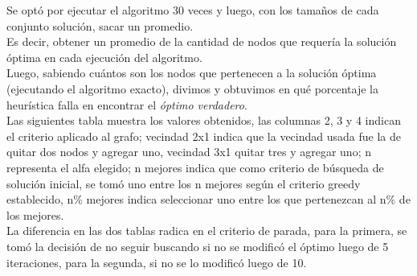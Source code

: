 \bigskip

Se opt\'o por ejecutar el algoritmo 30 veces y luego, con los tama\~nos de cada conjunto soluci\'on, sacar un promedio.\\

Es decir, obtener un promedio de la cantidad de nodos que requer\'ia la soluci\'on \'optima en cada ejecuci\'on del algoritmo.\\

Luego, sabiendo cu\'antos son los nodos que pertenecen a la soluci\'on \'optima (ejecutando el algoritmo exacto), divimos y obtuvimos en qu\'e porcentaje la heur\'istica falla en encontrar el \textit{\'optimo verdadero}.\\

Las siguientes tabla muestra los valores obtenidos, las columnas 2, 3 y 4 indican el criterio aplicado al grafo; vecindad 2x1 indica que la vecindad usada fue la de quitar dos nodos y agregar uno, vecindad 3x1 quitar tres y agregar uno; n representa el alfa elegido; n mejores indica que como criterio de b\'usqueda de soluci\'on inicial, se tom\'o uno entre los n mejores seg\'un el criterio greedy establecido, n\% mejores indica seleccionar uno entre los que pertenezcan al n\% de los mejores.\\

La diferencia en las dos tablas radica en el criterio de parada, para la primera, se tom\'o la decisi\'on de no seguir buscando si no se modific\'o el \'optimo luego de 5 iteraciones, para la segunda, si no se lo modific\'o luego de 10.\\

